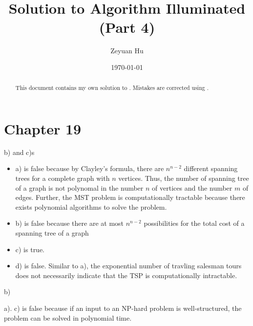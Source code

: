 \documentclass[letterpaper,12pt]{article}
\begin{document}
	
\title{Solution to Algorithm Illuminated (Part 4)}
\date{\today}
\author{Zeyuan Hu}
\maketitle
	
\begin{abstract}
This document contains my own solution to \cite{Roughgarden2020}. Mistakes are corrected using .
\end{abstract}

\tableofcontents

\section{Chapter 19}

\begin{problem}{19.1}
\end{problem}

b) and c)s

\begin{problem}{19.2}
\end{problem}

\begin{itemize}
	\item a) is false because by Clayley's formula, there are $n^{n-2}$ different spanning trees for a complete graph with $n$ vertices. Thus, the number of spanning tree of a graph is not polynomal in the number $n$ of vertices and the number $m$ of edges. Further, the MST problem is computationally tractable because there exists polynomial algorithms to solve the problem.
	\item b) is false because there are at most $n^{n-2}$ possibilities for the total cost of a spanning tree of a graph
	\item c) is true.
	\item d) is false. Similar to a), the exponential number of travling salesman tours does not necessarily indicate that the TSP is computationally intractable.
\end{itemize}

\begin{problem}{19.3}
\end{problem}

b)

\begin{problem}{19.4}
\end{problem}

a).  c) is false because if an input to an NP-hard problem is well-structured, the problem can be solved in polynomial time.
\end{document}
